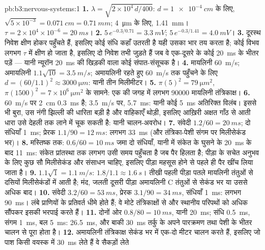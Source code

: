 \begin{solution}{pb:b3:nervous-systems:1}
\textbf{1.} $\lambda = \sqrt{2\times 10^{4}\,d/400}$: $d =
\qty{1e-4}{cm}$ के लिए, $\sqrt{5\times 10^{-3}} = \qty{0.071}{cm} =
\qty{0.71}{mm}$; \qty{4}{\micro m} के लिए, \qty{1.41}{mm}। $\tau = 2\times
10^{4}\times 10^{-6} = \qty{20}{ms}$।
\textbf{2.} $5\,e^{-0.3/0.71} = \qty{3.3}{mV}$; $5\,e^{-0.3/1.41} =
\qty{4.0}{mV}$।
\textbf{3.} दूरस्थ निवेश क्षीण होकर पहुँचते हैं, इसलिए कोई संधि कहाँ
उतरती है यही उसका भार तय करता है; कोई विभव लगभग $\tau$ में क्षीण हो
जाता है, इसलिए दो निवेश तभी जुड़ते हैं जब वे एक-दूसरे के कोई
\qty{20}{ms} के भीतर पड़ें --- यानी न्यूरॉन \qty{20}{ms} की खिड़की
वाला कोई संपात-संसूचक है।
\textbf{4.} मायलिनी \qty{60}{m/s}; अमायलिनी $1.1\sqrt{10} =
\qty{3.5}{m/s}$; अमायलिनी रहते हुए \qty{60}{m/s} तक पहुँचने के लिए
$d = (60/1.1)^{2}
\approx \qty{3000}{\micro m}$: यानी तीन मिलीमीटर।
\textbf{5.} $\pi(5)^{2} = \qty{79}{\micro m^2}$, $\pi(1500)^{2} =
7\times 10^{6}\,\unit{\micro m^2}$ के सामने: एक की जगह में लगभग
\num{90000} मायलिनी तंत्रिकाक्ष।
\textbf{6.} \qty{60}{m/s} पर \qty{2}{cm} \qty{0.3}{ms} है;
\qty{3.5}{m/s} पर, \qty{5.7}{ms}: यानी कोई \qty{5}{ms} अतिरिक्त विलंब।
इससे भी बुरा, उस नंगी झिल्ली की धारिता बड़ी है और वाहिकाएँ थोड़ी, इसलिए
आख़िरी अक्षत गाँठ से आती धारा उसे देहली तक लाने में चूक सकती है: यानी
चालन-अवरोध।
\textbf{7.} संवेदी $1.2/60 = \qty{20}{ms}$; दो संधियाँ \qty{1}{ms};
प्रेरक $1.1/90 = \qty{12}{ms}$: लगभग \qty{33}{ms} (और तंत्रिका-पेशी
संगम पर मिलीसेकंड भर)।
\textbf{8.} मस्तिष्क तक: $0.6/60 = \qty{10}{ms}$ जमा दो संधियाँ, यानी
 में संकेत के घुसने के \qty{20}{ms} के बाद \qty{11}{ms}: संकेत
प्रांतस्था तक लगभग उसी समय पहुँचता है जब पैर हिलता है; पीड़ा के सचेत
अनुभव के लिए कुछ सौ मिलीसेकंड और संसाधन चाहिए, इसलिए पीड़ा महसूस होने
से पहले ही पैर खींच लिया जाता है।
\textbf{9.} $1.1\sqrt{1} = \qty{1.1}{m/s}$: $1.8/1.1 \approx
\qty{1.6}{s}$। तीखी पहली पीड़ा पतले मायलिनी तंतुओं से दसियों
मिलीसेकंडों में आती है; मंद, जलती दूसरी पीड़ा अमायलिनी C तंतुओं से
सेकंड भर या उससे अधिक बाद।
\textbf{10.} संवेदी $3.2/60 = \qty{53}{ms}$, प्रेरक $3.1/90 =
\qty{34}{ms}$, संधियाँ \qty{1}{ms}: लगभग \qty{90}{ms}। लंबे प्राणियों
के प्रतिवर्त धीमे होते हैं; वे मोटे तंत्रिकाक्षों से और स्थानीय परिपथों
को अधिक सौंपकर इसकी भरपाई करते हैं।
\textbf{11.} दोनों ओर $0.8/80 = \qty{10}{ms}$, यानी \qty{20}{ms}; संधि
\qty{0.5}{ms}, संगम \qty{1}{ms}, बल \qty{5}{ms}: \qty{26.5}{ms}, और
बाकी \qty{30}{ms} तर्कु के अपने पारक्रमण तथा पेशी के भीतर चालन से पूरा
होता है।
\textbf{12.} अमायलिनी तंत्रिकाक्ष सेकंड भर में एक-दो मीटर चालन करते
हैं, इसलिए जो पाश किसी वयस्क में \qty{30}{ms} लेते हैं वे सैकड़ों लेते

\end{solution}
